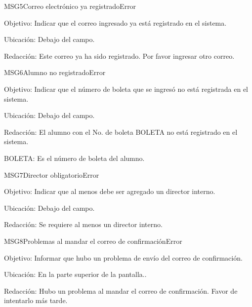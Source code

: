 \begin{mensaje}{MSG5}{Correo electrónico ya registrado}{Error}
	\item[Objetivo:] Indicar que el correo ingresado ya está registrado en el sistema.
    \item[Ubicación:] Debajo del campo.
    \item[Redacción:] Este correo ya ha sido registrado. Por favor ingresar otro correo.
\end{mensaje}

\begin{mensaje}{MSG6}{Alumno no registrado}{Error}
	\item[Objetivo:] Indicar que el número de boleta que se ingresó no está registrada en el sistema.
	\item[Ubicación:] Debajo del campo.
	\item[Redacción:] El alumno con el No. de boleta BOLETA no está registrado en el sistema.
	\begin{Citemize}
		\item BOLETA: Es el número de boleta del alumno.
	\end{Citemize}
\end{mensaje}

\begin{mensaje}{MSG7}{Director obligatorio}{Error}
	\item[Objetivo:]  Indicar que al menos debe ser agregado un director interno.
	\item[Ubicación:] Debajo del campo.
	\item[Redacción:] Se requiere al menos un director interno.
\end{mensaje}

\begin{mensaje}{MSG8}{Problemas al mandar el correo de confirmación}{Error}
	\item[Objetivo:]  Informar que hubo un problema de envío del correo de confirmación.
	\item[Ubicación:] En la parte superior de la pantalla..
	\item[Redacción:] Hubo un problema al mandar el correo de confirmación. Favor de intentarlo más tarde.
\end{mensaje}

